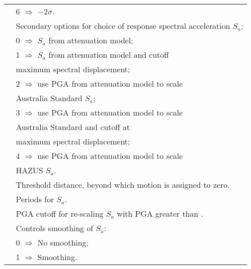 \begin{supertabular}{lp{0.6\textwidth}}
 & \hspace{0.5em} 6 $\Rightarrow$ $-2\sigma$.\\
 & Secondary options for choice of
response spectral acceleration $S_a$: \\
 & \hspace{0.5em} 0 $\Rightarrow$ $S_a$ from attenuation model; \\
 & \hspace{0.5em} 1 $\Rightarrow$ $S_a$ from attenuation model and cutoff\\
 & \hspace{2.8em} maximum spectral displacement; \\
 & \hspace{0.5em} 2 $\Rightarrow$ use PGA from attenuation model to scale\\
 & \hspace{2.8em} Australia Standard $S_a$; \\
 & \hspace{0.5em} 3 $\Rightarrow$ use PGA from attenuation model to scale \\
 & \hspace{2.8em} Australia Standard and cutoff at \\
 & \hspace{2.8em} maximum spectral displacement; \\
 & \hspace{0.5em} 4 $\Rightarrow$ use PGA from attenuation model to scale \\
 & \hspace{2.8em} HAZUS $S_a$. \\
  &  Threshold distance, beyond which motion is assigned to zero.       \\
 &  Periods for $S_a$.     \\
   & PGA cutoff for re-scaling $S_a$ with PGA greater than .      \\
  & Controls smoothing of $S_a$: \\
 & \hspace{0.5em} 0 $\Rightarrow$ No smoothing; \\
 & \hspace{0.5em} 1 $\Rightarrow$ Smoothing.  \\
 \end{supertabular}


